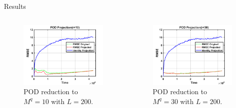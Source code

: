 \documentclass[aspectratio=169]{beamer}
\begin{document}
\begin{frame}{Results}
\vfill
\begin{columns}
    \begin{column}{.49\textwidth}
\begin{figure}[H]
\centering
\includegraphics[width=\textwidth]{figures/l96_pod10.png}
\caption{POD reduction to $M^q=10$ with $L=200$.}
\end{figure}
\vfill
\end{column}

 \begin{column}{.49\textwidth}
\vfill
\begin{figure}[H]
\centering
\includegraphics[width=\textwidth]{figures/l96_pod30.png}
\caption{POD reduction to $M^q=30$ with $L=200$.}
\end{figure}
 \end{column}
\end{columns}
\vfill
\end{frame}
\end{document}
